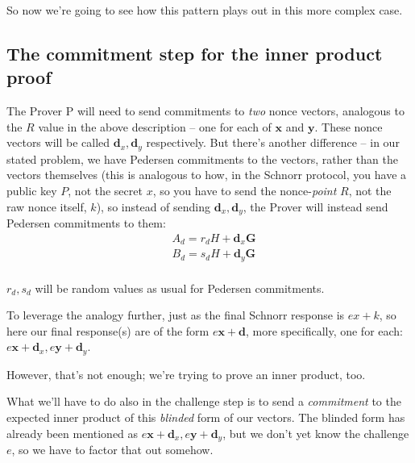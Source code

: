\documentclass[10pt,a4paper]{article}
\begin{document}
So now we're going to see how this pattern plays out in this more
complex case.

\hypertarget{the-commitment-step-for-the-inner-product-proof}{%
\subsection[The commitment step for the inner product
proof]{\texorpdfstring{\protect\hypertarget{anchor-36}{}{}The commitment
step for the inner product
proof}{The commitment step for the inner product proof}}\label{the-commitment-step-for-the-inner-product-proof}}

The Prover P will need to send commitments to \emph{two } nonce vectors, analogous to the
$R$ value in the above description -- one for each of $\mathbf{x}$ and
$\mathbf{y}$. These nonce vectors will be called $\mathbf{d}_x, \mathbf{d}_y$ respectively. But there's another
difference -- in our stated problem, we have Pedersen commitments to the
vectors, rather than the vectors themselves (this is analogous to how,
in the Schnorr protocol, you have a public key $P$, not the secret $x$, so you
have to send the nonce-\emph{point} $R$, not the raw nonce itself, $k$), so
instead of sending $\mathbf{d}_x, \mathbf{d}_y$, the Prover will instead send Pedersen commitments
to them:
\begin{align*}
&A_d = r_d H + \mathbf{d}_x\mathbf{G} \\
&B_d = s_d H + \mathbf{d}_y\mathbf{G} \\
\end{align*}

$r_d, s_d$ will be random values as usual for Pedersen commitments.

To leverage the analogy further, just as the final Schnorr response is $ex+k$,
so here our final response(s) are of the form $e\mathbf{x}+\mathbf{d}$, more specifically, one for each: $e\mathbf{x} + \mathbf{d}_x, e\mathbf{y}+\mathbf{d}_y$.

However, that's not enough; we're trying to prove an inner product, too.

What we'll have to do also in the challenge step is to send a
\emph{commitment} to the expected inner product of this \emph{blinded}
form of our vectors. The blinded form has already been mentioned as $e\mathbf{x} + \mathbf{d}_x, e\mathbf{y}+\mathbf{d}_y$,
but we don't yet know the challenge $e$, so we have to factor that out
somehow.
\end{document}
